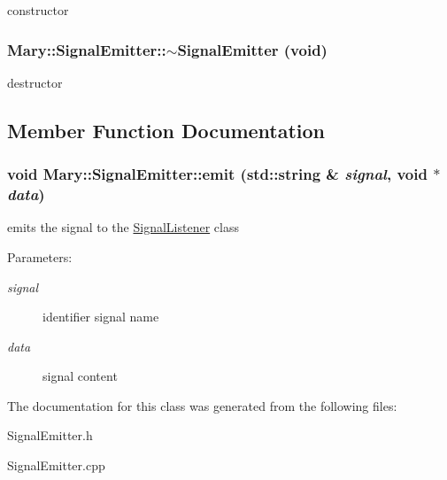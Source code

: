 constructor \hypertarget{class_mary_1_1_signal_emitter_2131ac1aaef12758a313b53e69752df9}{
\subsubsection[$\sim$SignalEmitter]{\setlength{\rightskip}{0pt plus 5cm}Mary::SignalEmitter::$\sim$SignalEmitter (void)}}
\label{class_mary_1_1_signal_emitter_2131ac1aaef12758a313b53e69752df9}


destructor 

\subsection{Member Function Documentation}
\hypertarget{class_mary_1_1_signal_emitter_4a78be0e66cacd7d54e2524409468101}{
\subsubsection[emit]{\setlength{\rightskip}{0pt plus 5cm}void Mary::SignalEmitter::emit (std::string \& {\em signal}, \/  void $\ast$ {\em data})}}
\label{class_mary_1_1_signal_emitter_4a78be0e66cacd7d54e2524409468101}


emits the signal to the \hyperlink{class_mary_1_1_signal_listener}{SignalListener} class \begin{Desc}
\item[Parameters:]
\begin{description}
\item[{\em signal}]identifier signal name \item[{\em data}]signal content \end{description}
\end{Desc}


The documentation for this class was generated from the following files:\begin{CompactItemize}
\item 
SignalEmitter.h\item 
SignalEmitter.cpp\end{CompactItemize}
